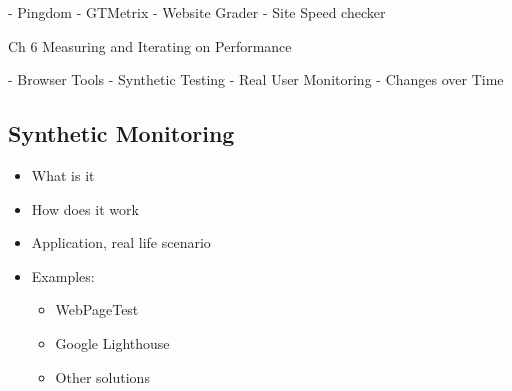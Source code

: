 - Pingdom
- GTMetrix
- Website Grader
- Site Speed checker












Ch 6 Measuring and Iterating on Performance

- Browser Tools
- Synthetic Testing
- Real User Monitoring
- Changes over Time















\subsection{Synthetic Monitoring}

\begin{itemize}
    \item What is it
    \item How does it work
    \item Application, real life scenario
    \item Examples:
    \begin{itemize}
        \item WebPageTest
        \item Google Lighthouse
        \item Other solutions
    \end{itemize}
\end{itemize}
















